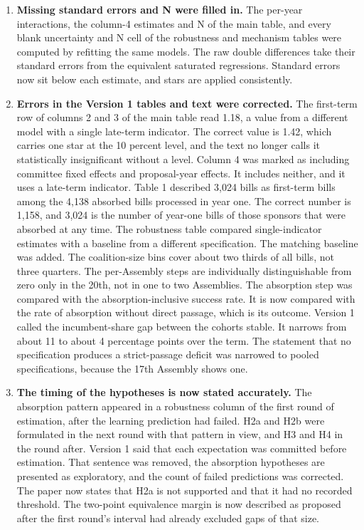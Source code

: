 \documentclass[11pt]{article}
\begin{document}
{\begin{enumerate}
\item \textbf{Missing standard errors and N were filled in.} The per-year interactions, the column-4 estimates and N of the main table, and every blank uncertainty and N cell of the robustness and mechanism tables were computed by refitting the same models. The raw double differences take their standard errors from the equivalent saturated regressions. Standard errors now sit below each estimate, and stars are applied consistently.
\item \textbf{Errors in the Version 1 tables and text were corrected.} The first-term row of columns 2 and 3 of the main table read 1.18, a value from a different model with a single late-term indicator. The correct value is 1.42, which carries one star at the 10 percent level, and the text no longer calls it statistically insignificant without a level. Column 4 was marked as including committee fixed effects and proposal-year effects. It includes neither, and it uses a late-term indicator. Table 1 described 3,024 bills as first-term bills among the 4,138 absorbed bills processed in year one. The correct number is 1,158, and 3,024 is the number of year-one bills of those sponsors that were absorbed at any time. The robustness table compared single-indicator estimates with a baseline from a different specification. The matching baseline was added. The coalition-size bins cover about two thirds of all bills, not three quarters. The per-Assembly steps are individually distinguishable from zero only in the 20th, not in one to two Assemblies. The absorption step was compared with the absorption-inclusive success rate. It is now compared with the rate of absorption without direct passage, which is its outcome. Version 1 called the incumbent-share gap between the cohorts stable. It narrows from about 11 to about 4 percentage points over the term. The statement that no specification produces a strict-passage deficit was narrowed to pooled specifications, because the 17th Assembly shows one.
\item \textbf{The timing of the hypotheses is now stated accurately.} The absorption pattern appeared in a robustness column of the first round of estimation, after the learning prediction had failed. H2a and H2b were formulated in the next round with that pattern in view, and H3 and H4 in the round after. Version 1 said that each expectation was committed before estimation. That sentence was removed, the absorption hypotheses are presented as exploratory, and the count of failed predictions was corrected. The paper now states that H2a is not supported and that it had no recorded threshold. The two-point equivalence margin is now described as proposed after the first round's interval had already excluded gaps of that size.

\end{enumerate}}
\end{document}
